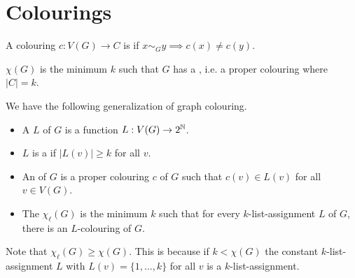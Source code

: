 \documentclass[main.tex]{subfiles}
\begin{document}
\section{Colourings}
\begin{definition*}
  A colouring $c:V(G)\to C$ is  if
  $x\sim_G y\implies c(x)\neq c(y)$.

  {\color{blue}$\chi(G)$} is the minimum $k$ such that $G$ has a
  , i.e. a proper colouring where $|C| = k$.
\end{definition*}
We have the following generalization of graph colouring.
\begin{definition*}
  \listhack
  \begin{itemize}
    \item A  $L$ of $G$ is a function $L:V(G)\to 2^\mathbb N$.
    \item $L$ is a 
      if $|L(v)|\geq k$ for all $v$.

    \item An  of $G$ is a proper colouring
      $c$ of $G$ such that $c(v)\in L(v)$ for all $v\in V(G)$.

    \item The  $\chi_\ell(G)$ is the minimum $k$
      such that for every $k$-list-assignment $L$ of $G$, there is an
      $L$-colouring of $G$.
  \end{itemize}
\end{definition*}
Note that $\chi_\ell(G)\geq\chi(G)$.
This is because if $k < \chi(G)$ the constant $k$-list-assignment $L$ with
$L(v) = \{1,\ldots,k\}$ for all $v$ is a $k$-list-assignment.
\end{document}
